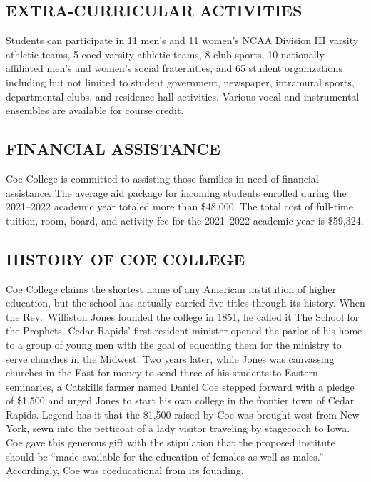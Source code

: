 \documentclass[
  letterpaper,
]{scrbook}
\begin{document}
\hypertarget{extra-curricular-activities}{%
\subsection{EXTRA-CURRICULAR
ACTIVITIES}\label{extra-curricular-activities}}

Students can participate in 11 men's and 11 women's NCAA Division III
varsity athletic teams, 5 coed varsity athletic teams, 8 club sports, 10
nationally affiliated men's and women's social fraternities, and 65
student organizations including but not limited to student government,
newspaper, intramural sports, departmental clubs, and residence hall
activities. Various vocal and instrumental ensembles are available for
course credit.

\hypertarget{financial-assistance}{%
\subsection{FINANCIAL ASSISTANCE}\label{financial-assistance}}

Coe College is committed to assisting those families in need of
financial assistance. The average aid package for incoming students
enrolled during the 2021--2022 academic year totaled more than \$48,000.
The total cost of full-time tuition, room, board, and activity fee for
the 2021--2022 academic year is \$59,324.

\hypertarget{history-of-coe-college}{%
\subsection{HISTORY OF COE COLLEGE}\label{history-of-coe-college}}

Coe College claims the shortest name of any American institution of
higher education, but the school has actually carried five titles
through its history. When the Rev.~Williston Jones founded the college
in 1851, he called it The School for the Prophets. Cedar Rapids' first
resident minister opened the parlor of his home to a group of young men
with the goal of educating them for the ministry to serve churches in
the Midwest. Two years later, while Jones was canvassing churches in the
East for money to send three of his students to Eastern seminaries, a
Catskills farmer named Daniel Coe stepped forward with a pledge of
\$1,500 and urged Jones to start his own college in the frontier town of
Cedar Rapids. Legend has it that the \$1,500 raised by Coe was brought
west from New York, sewn into the petticoat of a lady visitor traveling
by stagecoach to Iowa. Coe gave this generous gift with the stipulation
that the proposed institute should be ``made available for the education
of females as well as males.'' Accordingly, Coe was coeducational from
its founding.
\end{document}
